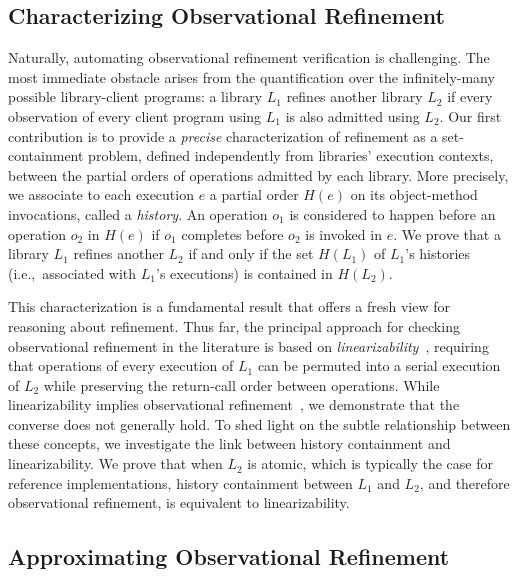 \subsection{Characterizing Observational Refinement}
\label{sec:intro:histories}

Naturally, automating observational refinement verification is challenging. The
most immediate obstacle arises from the quantification over the infinitely-many
possible library-client programs: a library $L_1$ refines another library $L_2$
if every observation of every client program using $L_1$ is also admitted using
$L_2$. Our first contribution is to provide a \emph{precise} characterization
of refinement as a set-containment problem, defined independently from libraries'
execution contexts, between the partial orders of operations admitted by each
library. More precisely, we associate to each execution $e$ a partial order
$H(e)$ on its object-method invocations, called a \emph{history}. An operation
$o_1$ is considered to happen before an operation $o_2$ in $H(e)$ if $o_1$
completes before $o_2$ is invoked in $e$. We prove that a library $L_1$ refines
another $L_2$ if and only if the set $H(L_1)$ of $L_1$'s histories
(i.e.,~associated with $L_1$'s executions) is contained in $H(L_2)$.

This characterization is a fundamental result that offers a fresh view for
reasoning about refinement. Thus far, the principal approach for checking
observational refinement in the literature is based on
\emph{linearizability}~\cite{journals/toplas/HerlihyW90}, requiring that
operations of every execution of $L_1$ can be permuted into a serial execution
of $L_2$ while preserving the return-call order between operations. While
linearizability implies observational
refinement~\cite{journals/tcs/FilipovicORY10}, we demonstrate that the converse
does not generally hold. To shed light on the subtle relationship between these
concepts, we investigate the link between history containment and
linearizability. We prove that when $L_2$ is atomic, which is typically the
case for reference implementations, history containment between $L_1$ and
$L_2$, and therefore observational refinement, is equivalent to linearizability.


\subsection{Approximating Observational Refinement}
\label{sec:intro:approx}

